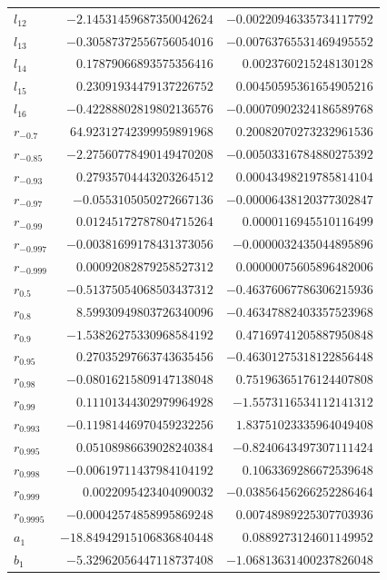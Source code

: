 \documentclass[11pt]{article}
\theoremstyle{definition}
\begin{document}
{\begin{longtable}{lrr}
$l_{12}$ & $-2.14531459687350042624$ & $-0.00220946335734117792$\\
$l_{13}$ & $-0.30587372556756054016$ & $-0.00763765531469495552$\\
$l_{14}$ & $0.17879066893575356416$ & $0.0023760215248130128$\\
$l_{15}$ & $0.23091934479137226752$ & $0.00450595361654905216$\\
$l_{16}$ & $-0.42288802819802136576$ & $-0.00070902324186589768$\\
$r_{-0.7}$ & $64.92312742399959891968$ & $0.20082070273232961536$\\
$r_{-0.85}$ & $-2.27560778490149470208$ & $-0.00503316784880275392$\\
$r_{-0.93}$ & $0.27935704443203264512$ & $0.00043498219785814104$\\
$r_{-0.97}$ & $-0.0553105050272667136$ & $-0.00006438120377302847$\\
$r_{-0.99}$ & $0.01245172787804715264$ & $0.0000116945510116499$\\
$r_{-0.997}$ & $-0.00381699178431373056$ & $-0.0000032435044895896$\\
$r_{-0.999}$ & $0.00092082879258527312$ & $0.00000075605896482006$\\
$r_{0.5}$ & $-0.51375054068503437312$ & $-0.46376067786306215936$\\
$r_{0.8}$ & $8.59930949803726340096$ & $-0.46347882403357523968$\\
$r_{0.9}$ & $-1.53826275330968584192$ & $0.47169741205887950848$\\
$r_{0.95}$ & $0.27035297663743635456$ & $-0.46301275318122856448$\\
$r_{0.98}$ & $-0.08016215809147138048$ & $0.75196365176124407808$\\
$r_{0.99}$ & $0.11101344302979964928$ & $-1.5573116534112141312$\\
$r_{0.993}$ & $-0.11981446970459232256$ & $1.83751023335964049408$\\
$r_{0.995}$ & $0.05108986639028240384$ & $-0.8240643497307111424$\\
$r_{0.998}$ & $-0.00619711437984104192$ & $0.1063369286672539648$\\
$r_{0.999}$ & $0.0022095423404090032$ & $-0.03856456266252286464$\\
$r_{0.9995}$ & $-0.00042574858995869248$ & $0.00748989225307703936$\\
$a_{1}$ & $-18.84942915106836840448$ & $0.0889273124601149952$\\
$b_{1}$ & $-5.32962056447118737408$ & $-1.06813631400237826048$\\

\end{longtable}}
\end{document}
